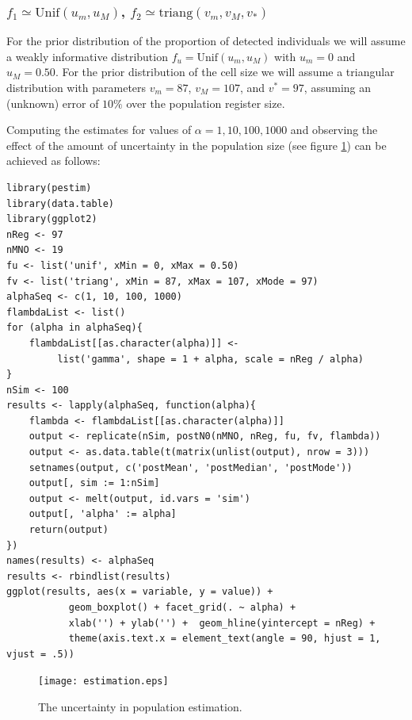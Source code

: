 \documentclass[12pt, a4paper]{article}
\begin{document}
\subsubsection{$f_{1}\simeq\textrm{Unif}(u_{m}, u_{M})$, $f_{2}\simeq\textrm{triang}(v_{m}, v_{M}, v_{*})$}
For the prior distribution of the proportion 
of detected individuals we will assume a weakly informative distribution 
$f_{u}=\textrm{Unif}(u_{m}, u_{M})$ with $u_{m}=0$ and $u_{M}=0.50$. For the prior 
distribution of the cell size we will assume a triangular distribution with 
parameters $v_{m}=87$, $v_{M}=107$, and $v^{*}=97$, assuming an (unknown) error of $10\%$ over 
the population register size.

Computing the estimates for values of $\alpha=1,10,100,1000$ and observing the effect of the amount of 
uncertainty in the population size (see figure \ref{one}) can be achieved as follows:

\begin{verbatim}
library(pestim)
library(data.table)
library(ggplot2)
nReg <- 97
nMNO <- 19
fu <- list('unif', xMin = 0, xMax = 0.50)
fv <- list('triang', xMin = 87, xMax = 107, xMode = 97)
alphaSeq <- c(1, 10, 100, 1000)
flambdaList <- list()
for (alpha in alphaSeq){
    flambdaList[[as.character(alpha)]] <- 
         list('gamma', shape = 1 + alpha, scale = nReg / alpha)	
}
nSim <- 100
results <- lapply(alphaSeq, function(alpha){
    flambda <- flambdaList[[as.character(alpha)]]
    output <- replicate(nSim, postN0(nMNO, nReg, fu, fv, flambda))
    output <- as.data.table(t(matrix(unlist(output), nrow = 3)))
    setnames(output, c('postMean', 'postMedian', 'postMode'))
    output[, sim := 1:nSim]
    output <- melt(output, id.vars = 'sim')
    output[, 'alpha' := alpha]
    return(output)
})
names(results) <- alphaSeq
results <- rbindlist(results)
ggplot(results, aes(x = variable, y = value)) + 
           geom_boxplot() + facet_grid(. ~ alpha) + 
           xlab('') + ylab('') +  geom_hline(yintercept = nReg) + 
           theme(axis.text.x = element_text(angle = 90, hjust = 1, vjust = .5))
\end{verbatim}

\begin{figure}
	\centering
	\texttt{[image: estimation.eps]}
	\caption{The uncertainty in population estimation.}
	\label{one}
\end{figure}
\end{document}
